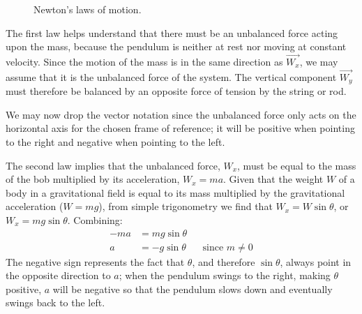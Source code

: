 \documentclass[12pt, a4paper, titlepage]{article}
\theoremstyle{definition}
\numberwithin{equation}{section}
\theoremstyle{definition}
\theoremstyle{definition}
\begin{document}
\begin{figure}
\noindent\hspace*{-6pt}\setlength\fboxsep{1cm}
\caption[Newton's laws of motion]{Newton's laws of motion. \parencite[pp. 56-67]{hamper}}
\label{fig:newton}
\end{figure}

The first law helps understand that there must be an unbalanced force acting upon the mass, because the pendulum is neither at rest nor moving at constant velocity. Since the motion of the mass is in the same direction as $\vec{W_x}$, we may assume that it is the unbalanced force of the system. The vertical component $\vec{W_y}$ must therefore be balanced by an opposite force of tension by the string or rod.

We may now drop the vector notation since the unbalanced force only acts on the horizontal axis for the chosen frame of reference; it will be positive when pointing to the right and negative when pointing to the left.

The second law implies that the unbalanced force, $W_x$, must be equal to the mass of the bob multiplied by its acceleration, $W_x=ma$. Given that the weight $W$ of a body in a gravitational field is equal to its mass multiplied by the gravitational acceleration ($W=mg$), from simple trigonometry we find that $W_x=W\sin\theta$, or $W_x=mg\sin\theta$. Combining:
\begin{align}
-ma&=mg\sin\theta\\
a&=-g\sin\theta&&\text{since $m\neq0$}\label{eq:mamgsint}
\end{align}
The negative sign represents the fact that $\theta$, and therefore $\sin\theta$, always point in the opposite direction to $a$; when the pendulum swings to the right, making $\theta$ positive, $a$ will be negative so that the pendulum slows down and eventually swings back to the left.
\end{document}
